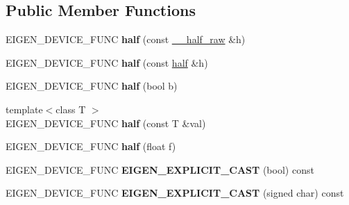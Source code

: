 \subsection*{Public Member Functions}
\begin{DoxyCompactItemize}
\item 
\mbox{\label{struct_eigen_1_1half_a5018dc44cb5018efb362cf5a18822b5a}} 
E\+I\+G\+E\+N\+\_\+\+D\+E\+V\+I\+C\+E\+\_\+\+F\+U\+NC {\bfseries half} (const \mbox{\hyperlink{struct_eigen_1_1half__impl_1_1____half__raw}{\+\_\+\+\_\+half\+\_\+raw}} \&h)
\item 
\mbox{\label{struct_eigen_1_1half_a164c583ebcb7826def575cc105c8c284}} 
E\+I\+G\+E\+N\+\_\+\+D\+E\+V\+I\+C\+E\+\_\+\+F\+U\+NC {\bfseries half} (const \mbox{\hyperlink{struct_eigen_1_1half}{half}} \&h)
\item 
\mbox{\label{struct_eigen_1_1half_a6d3741a7999bec720162c4fc8cdf17b8}} 
E\+I\+G\+E\+N\+\_\+\+D\+E\+V\+I\+C\+E\+\_\+\+F\+U\+NC {\bfseries half} (bool b)
\item 
\mbox{\label{struct_eigen_1_1half_ad9417b03b1647ba1a11fa878d6b6f6da}} 
{\footnotesize template$<$class T $>$ }\\E\+I\+G\+E\+N\+\_\+\+D\+E\+V\+I\+C\+E\+\_\+\+F\+U\+NC {\bfseries half} (const T \&val)
\item 
\mbox{\label{struct_eigen_1_1half_a9d2a0ff89919f07454e80c677bd3e4ae}} 
E\+I\+G\+E\+N\+\_\+\+D\+E\+V\+I\+C\+E\+\_\+\+F\+U\+NC {\bfseries half} (float f)
\item 
\mbox{\label{struct_eigen_1_1half_aeef3ed6d55a3eb70d1434f8576d3cfea}} 
E\+I\+G\+E\+N\+\_\+\+D\+E\+V\+I\+C\+E\+\_\+\+F\+U\+NC {\bfseries E\+I\+G\+E\+N\+\_\+\+E\+X\+P\+L\+I\+C\+I\+T\+\_\+\+C\+A\+ST} (bool) const
\item 
\mbox{\label{struct_eigen_1_1half_aa957f6c648dc3188adee73cf50682786}} 
E\+I\+G\+E\+N\+\_\+\+D\+E\+V\+I\+C\+E\+\_\+\+F\+U\+NC {\bfseries E\+I\+G\+E\+N\+\_\+\+E\+X\+P\+L\+I\+C\+I\+T\+\_\+\+C\+A\+ST} (signed char) const
\item 
\mbox{\label{struct_eigen_1_1half_ae56d5d68c54e0d8b7beab386ef2e8a0d}} 

\end{DoxyCompactItemize}
